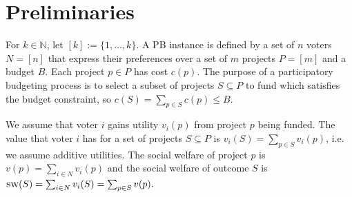 \documentclass{comsoc2023}
\newcommand{\sw}{\textsc{sw}}
\newcommand{\voters}{{N}}
\begin{document}

\section{Preliminaries}\label{sec:prem}

For   $k\in \mathbb{N}$,  let $[k] := \{1,\ldots,k\}$. A PB instance is defined by a set of $n$ voters $N=[n]$ that express their preferences over a set of $m$  projects $P=[m]$ and a budget $B$. 
Each project  $p\in P$ has cost   $c(p)$. 
The purpose  of  a participatory budgeting process  is to select  a subset of projects $S\subseteq P$  to fund which satisfies the budget constraint, so $c(S) =  \sum_{p\in S} c(p) \leq B$. 



We assume that voter $i$ gains utility $v_i(p)$ from project $p$ being funded. The value that  voter $i$ has for a set of projects $S\subseteq P$ is $v_i(S) = \sum_{p\in S} v_i(p)$, i.e. we assume additive utilities. 
The social welfare of project $p$ is $ v(p) = \sum_{i \in \voters} v_i(p)$ and the social welfare of outcome $S$ is $\sw(S) = \sum_{i\in \voters} v_i(S) = \sum_{p \in S} v(p).$ 
\end{document}
